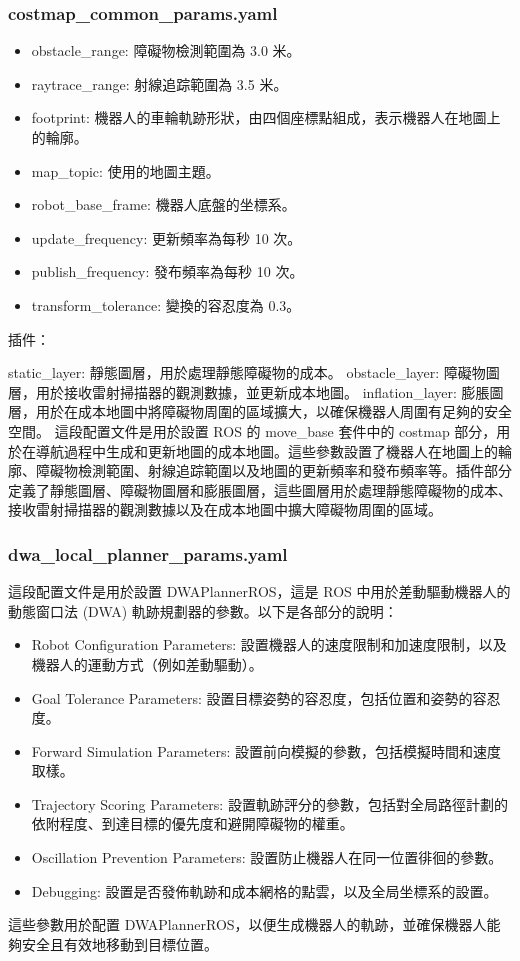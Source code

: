 \subsubsection{costmap\_common\_params.yaml}
\begin{itemize}
    \item obstacle\_range: 障礙物檢測範圍為 3.0 米。
    \item raytrace\_range: 射線追踪範圍為 3.5 米。
    \item footprint: 機器人的車輪軌跡形狀，由四個座標點組成，表示機器人在地圖上的輪廓。
    \item map\_topic: 使用的地圖主題。
    \item robot\_base\_frame: 機器人底盤的坐標系。
    \item update\_frequency: 更新頻率為每秒 10 次。
    \item publish\_frequency: 發布頻率為每秒 10 次。
    \item transform\_tolerance: 變換的容忍度為 0.3。
\end{itemize}
插件：

static\_layer: 靜態圖層，用於處理靜態障礙物的成本。
obstacle\_layer: 障礙物圖層，用於接收雷射掃描器的觀測數據，並更新成本地圖。
inflation\_layer: 膨脹圖層，用於在成本地圖中將障礙物周圍的區域擴大，以確保機器人周圍有足夠的安全空間。
這段配置文件是用於設置 ROS 的 move\_base 套件中的 costmap 部分，用於在導航過程中生成和更新地圖的成本地圖。這些參數設置了機器人在地圖上的輪廓、障礙物檢測範圍、射線追踪範圍以及地圖的更新頻率和發布頻率等。插件部分定義了靜態圖層、障礙物圖層和膨脹圖層，這些圖層用於處理靜態障礙物的成本、接收雷射掃描器的觀測數據以及在成本地圖中擴大障礙物周圍的區域。

\subsubsection{dwa\_local\_planner\_params.yaml}

這段配置文件是用於設置 DWAPlannerROS，這是 ROS 中用於差動驅動機器人的動態窗口法 (DWA) 軌跡規劃器的參數。以下是各部分的說明：

\begin{itemize}
    \item Robot Configuration Parameters: 設置機器人的速度限制和加速度限制，以及機器人的運動方式（例如差動驅動）。
    \item Goal Tolerance Parameters: 設置目標姿勢的容忍度，包括位置和姿勢的容忍度。
    \item Forward Simulation Parameters: 設置前向模擬的參數，包括模擬時間和速度取樣。
    \item Trajectory Scoring Parameters: 設置軌跡評分的參數，包括對全局路徑計劃的依附程度、到達目標的優先度和避開障礙物的權重。
    \item Oscillation Prevention Parameters: 設置防止機器人在同一位置徘徊的參數。
    \item Debugging: 設置是否發佈軌跡和成本網格的點雲，以及全局坐標系的設置。
\end{itemize}
這些參數用於配置 DWAPlannerROS，以便生成機器人的軌跡，並確保機器人能夠安全且有效地移動到目標位置。

